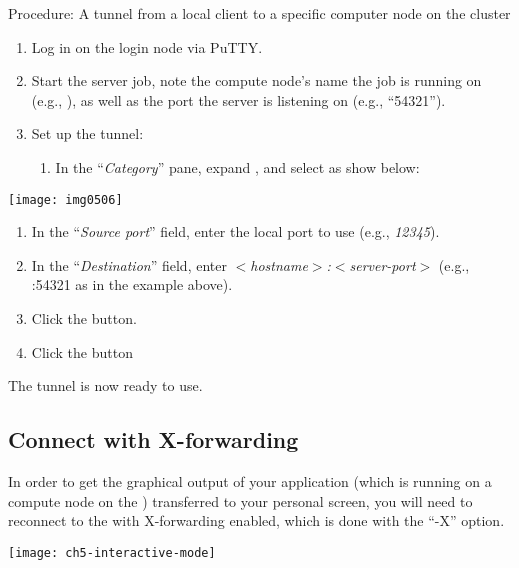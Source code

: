   Procedure: A tunnel from a local client to a specific computer node on the cluster

  \begin{enumerate}
    \item  Log in on the login node via PuTTY.
    \item  Start the server job, note the compute node's name the job is running
    on (e.g., \computenode), as well as the port the server is listening on
  (e.g., ``54321'').  \item  Set up the tunnel:

    \begin{enumerate}
      \item  In the ``\emph{Category}'' pane, expand , and select  as show below:
    \end{enumerate}
  \end{enumerate}

  \begin{center}
  \texttt{[image: img0506]}
  \end{center}

  \begin{enumerate}
    \item  In the ``\emph{Source port}'' field, enter the local port to use (e.g., \emph{12345}).
    \item  In the ``\emph{Destination}'' field, enter \emph{$<$hostname$>$:$<$server-port$>$} (e.g., \computenode:54321 as in the example above).
    \item  Click the  button.
    \item  Click the  button
  \end{enumerate}

  The tunnel is now ready to use.
\fi %

\ifmacORlinux
\subsection{Connect with X-forwarding}

In order to get the graphical output of your application (which is running on a
compute node on the \hpc) transferred to your personal screen, you will need
to reconnect to the \hpc with X-forwarding enabled, which is done with the
``-X'' option.

\begin{center}
\texttt{[image: ch5-interactive-mode]}
\end{center}

